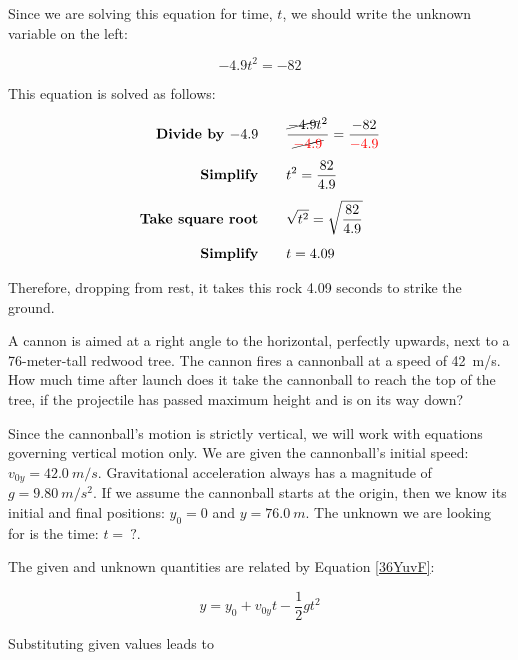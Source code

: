 \documentclass{article}
\begin{document}
Since we are solving this equation for time, $t$, we should write the unknown variable on the left:

\begin{equation*}
    -4.9 t^2 = -82
\end{equation*}

This equation is solved as follows:

\begin{align*}
    \textbf{Divide by $-4.9$} \qquad & \frac{\cancel{-4.9} t^2}{\cancel{\mathbin{\color{red} -} \textcolor{red}{4.9}}} = \frac{-82}{\mathbin{\color{red} -} \textcolor{red}{4.9}}\\[1ex]
    \textbf{Simplify} \qquad & t^2 = \frac{82}{4.9}\\[1ex]
    \textbf{Take square root} \qquad & \sqrt{t^2} = \sqrt{\frac{82}{4.9}}\\[1ex]
    \textbf{Simplify} \qquad & t = 4.09
\end{align*}

Therefore, dropping from rest, it takes this rock 4.09 seconds to strike the ground.

\endsolution


\begin{example} \label{lB7EDG}
    A cannon is aimed at a right angle to the horizontal, perfectly upwards, next to a 76-meter-tall redwood tree. The cannon fires a cannonball at a speed of \SI{42}{m/s}. How much time after launch does it take the cannonball to reach the top of the tree, if the projectile has passed maximum height and is on its way down?
\end{example}

\Solution Since the cannonball's motion is strictly vertical, we will work with equations governing vertical motion only. We are given the cannonball's initial speed: $v_{0y} = \SI{42.0}{m/s}$. Gravitational acceleration always has a magnitude of $g = \SI{9.80}{m/s^2}$. If we assume the cannonball starts at the origin, then we know its initial and final positions: $y_0 = 0$ and $y = \SI{76.0}{m}$. The unknown we are looking for is the time: $t =\ ?$.

\vspace{1em}

The given and unknown quantities are related by Equation \eqref{36YuvF}:

\begin{equation*}
    y = y_0 + v_{0y}t - \frac{1}{2}  g t^2
\end{equation*}

Substituting given values leads to 
\end{document}
